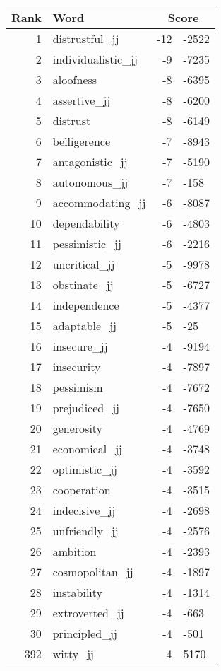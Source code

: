 \begin{longtable}[!htbp]{| rlr@{.}l |}
    \hline
    \textbf{Rank} & \textbf{Word} & \multicolumn{2}{c|}{\textbf{Score}} \\
    \hline
    \endhead
    1 & distrustful\_jj & -12 & -2522 \\
    2 & individualistic\_jj & -9 & -7235 \\
    3 & aloofness & -8 & -6395 \\
    4 & assertive\_jj & -8 & -6200 \\
    5 & distrust & -8 & -6149 \\
    6 & belligerence & -7 & -8943 \\
    7 & antagonistic\_jj & -7 & -5190 \\
    8 & autonomous\_jj & -7 & -158 \\
    9 & accommodating\_jj & -6 & -8087 \\
    10 & dependability & -6 & -4803 \\
    11 & pessimistic\_jj & -6 & -2216 \\
    12 & uncritical\_jj & -5 & -9978 \\
    13 & obstinate\_jj & -5 & -6727 \\
    14 & independence & -5 & -4377 \\
    15 & adaptable\_jj & -5 & -25 \\
    16 & insecure\_jj & -4 & -9194 \\
    17 & insecurity & -4 & -7897 \\
    18 & pessimism & -4 & -7672 \\
    19 & prejudiced\_jj & -4 & -7650 \\
    20 & generosity & -4 & -4769 \\
    21 & economical\_jj & -4 & -3748 \\
    22 & optimistic\_jj & -4 & -3592 \\
    23 & cooperation & -4 & -3515 \\
    24 & indecisive\_jj & -4 & -2698 \\
    25 & unfriendly\_jj & -4 & -2576 \\
    26 & ambition & -4 & -2393 \\
    27 & cosmopolitan\_jj & -4 & -1897 \\
    28 & instability & -4 & -1314 \\
    29 & extroverted\_jj & -4 & -663 \\
    30 & principled\_jj & -4 & -501 \\
    392 & witty\_jj & 4 & 5170 \\

\end{longtable}
